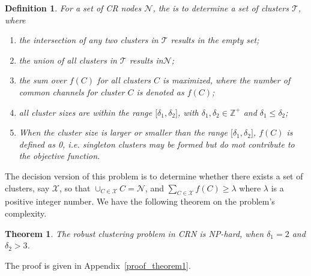 \documentclass[times]{ettauth}
\theoremstyle{mytheoremstyle}
\newtheorem{theorem}{Theorem}[section]
\theoremstyle{mytheoremstyle}
\theoremstyle{mytheoremstyle}
\newtheorem{mydef}{Definition}
\begin{document}
\begin{mydef}
\label{def_centralized_clustering}
For a set of CR nodes $\mathcal{N}$, the  is to determine a set of clusters $\mathcal{T}$, where 
\begin{enumerate}
\setlength{\itemindent}{.05in}
\item the intersection of any two clusters in $\mathcal{T}$ results in the empty set;
\item the union of all clusters in $\mathcal{T}$ results in$\mathcal{N}$;
\item the sum over $f(C)$ for all clusters $C$ is maximized, where the number of common channels for cluster $C$ is denoted as $f(C)$;

\item all cluster sizes are within the range $\big[\delta_1, \delta_2\big]$, with $\delta_1, \delta_2\in \mathbb{Z}^+$ and $\delta_1 \leq \delta_2$;
\item When the cluster size is larger or smaller than the range $\big[\delta_1, \delta_2\big]$, $f(C)$ is defined as 0, i.e. singleton clusters may be formed but do mot contribute to the objective function.

\end{enumerate}
\end{mydef}

The decision version of this problem is to determine whether there exists a set of clusters, say $\mathcal{X}$, so that $\cup_{C\in\mathcal{X}} C = \mathcal{N}$, and $\sum_{C\in \mathcal{X}} f(C) \geqslant \lambda$ where $\lambda$ is a positive integer number.
We have the following theorem on the problem's complexity.
\begin{theorem}
\label{theorem1}
The robust clustering problem in CRN is NP-hard, when $\delta_1=2$ and $\delta_2 > 3$.
\end{theorem}
The proof is given in Appendix~\ref{proof_theorem1}.
\end{document}
